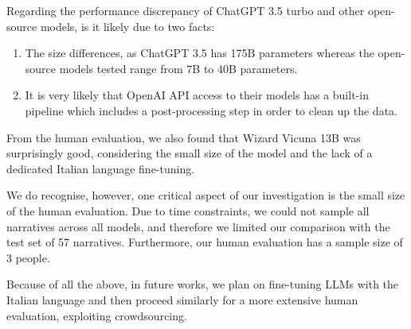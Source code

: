Regarding the performance discrepancy of ChatGPT 3.5 turbo and other open-source models, is it likely due to two facts:
\begin{enumerate}
    \item The size differences, as ChatGPT 3.5 has 175B parameters \cite{chatgpt-parameters} whereas the open-source models tested range from 7B to 40B parameters.
    \item It is very likely that OpenAI API access to their models has a built-in pipeline which includes a post-processing step in order to clean up the data.
\end{enumerate}


From the human evaluation, we also found that Wizard Vicuna 13B was surprisingly good, considering the small size of the model and the lack of a dedicated Italian language fine-tuning.

We do recognise, however, one critical aspect of our investigation is the small size of the human evaluation. Due to time constraints, we could not sample all narratives across all models, and therefore we limited our comparison with the test set of 57 narratives. Furthermore, our human evaluation has a sample size of 3 people. 

Because of all the above, in future works, we plan on fine-tuning LLMs with the Italian language and then proceed similarly for a more extensive human evaluation, exploiting crowdsourcing. 